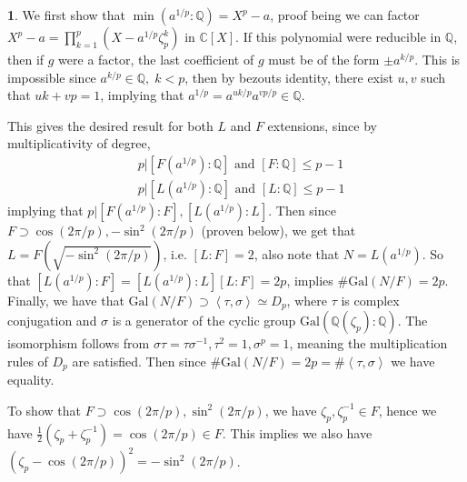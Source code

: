 \documentclass[11pt]{article}
\theoremstyle{definition}
\newtheorem{pb}{}
\newcommand{\gen}[1]{\left\langle #1 \right\rangle}
\newcommand{\tand}{\text{ and }}
\newcommand{\gal}{\text{Gal}}
\begin{document}
    \begin{pb}
        We first show that \(\min(a^{1/p}:\mathbb{Q}) = X^p - a\), proof being we can factor \(X^p - a = \prod_{k=1}^p (X - a^{1/p}\zeta_p^k)\) in \(\mathbb{C}[X]\). If this
        polynomial were reducible in \(\mathbb{Q}\), then if \(g\) were a factor, the last coefficient of \(g\) must be of the form \(\pm a^{k/p}\). This is impossible since
        \(a^{k/p} \in \mathbb{Q}, \; k < p\), then by bezouts identity, there exist \(u,v\) such that \(uk + vp = 1\), implying that \(a^{1/p} = a^{uk/p}a^{vp/p} \in \mathbb{Q}\).

        This gives the desired result for both \(L\) and \(F\) extensions, since by multiplicativity of degree,
        \begin{align*}
            &p \vert [F(a^{1/p}):\mathbb{Q}] \tand [F: \mathbb{Q}] \leq p-1 \\
            &p \vert [L(a^{1/p}):\mathbb{Q}] \tand [L: \mathbb{Q}] \leq p-1
        \end{align*}
        implying that \(p \vert [F(a^{1/p}):F], [L(a^{1/p}):L]\). Then since \(F \supset \cos(2\pi/p), -\sin^2(2\pi/p)\) (proven below), we get that \(L = F(\sqrt{-\sin^2(2\pi/p)})\), i.e. \([L:F] = 2\), also note that
        \(N = L(a^{1/p})\). So that \([L(a^{1/p}):F] = [L(a^{1/p}):L][L:F] = 2p\), implies \(\# \gal(N/F) = 2p\). Finally, we have that
        \(\gal(N/F) \supset \gen{\tau,\sigma} \simeq D_p\), where \(\tau\) is complex conjugation and \(\sigma\) is a generator of the cyclic group \(\gal(\mathbb{Q}(\zeta_p):\mathbb{Q})\). The
        isomorphism follows from \(\sigma\tau = \tau\sigma^{-1}, \tau^2 = 1, \sigma^p = 1\), meaning the multiplication rules of \(D_p\) are satisfied. Then since 
        \(\# \gal(N/F) = 2p = \# \gen{\tau,\sigma}\) we have equality.

        To show that \(F \supset \cos(2\pi/p), \sin^2(2\pi/p)\), we have \(\zeta_p, \zeta_p^{-1} \in F\), hence we have \(\frac12(\zeta_p + \zeta_p^{-1}) = \cos(2\pi/p) \in F\). This implies we also have
        \((\zeta_p - \cos(2\pi/p))^2 = -\sin^2(2\pi/p)\).

    \end{pb}
\end{document}

